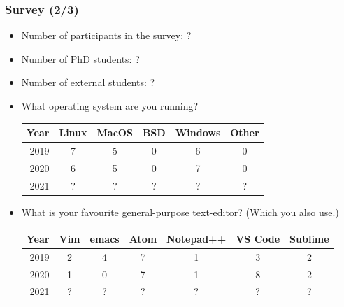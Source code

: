\begin{frame}

\frametitle{Survey (2/3)}

\begin{itemize}

\footnotesize

\item Number of participants in the survey: ?

\item Number of PhD students: ?

\item Number of external students: ?

\item What operating system are you running?

\begin{tabular}{|r|c|c|c|c|c|}
\hline
\textbf{Year} & \textbf{Linux} & \textbf{MacOS} & \textbf{BSD} &%
\textbf{Windows} & \textbf{Other}
\\\hline
2019 & 7 & 5 & 0 & 6 & 0 \\\hline
2020 & 6 & 5 & 0 & 7 & 0 \\\hline
2021 & ? & ? & ? & ? & ? \\\hline
\end{tabular}

\item What is your favourite general-purpose text-editor? (Which you also use.)

\begin{tabular}{|r|c|c|c|c|c|c|}
\hline
\textbf{Year} & \textbf{Vim} & \textbf{emacs} & \textbf{Atom} &%
\textbf{Notepad++} & \textbf{VS Code} & \textbf{Sublime}
\\\hline
2019 & 2 & 4 & 7 & 1 & 3 & 2 \\\hline
2020 & 1 & 0 & 7 & 1 & 8 & 2 \\\hline
2021 & ? & ? & ? & ? & ? & ? \\\hline
\end{tabular}



\end{itemize}

\end{frame}

